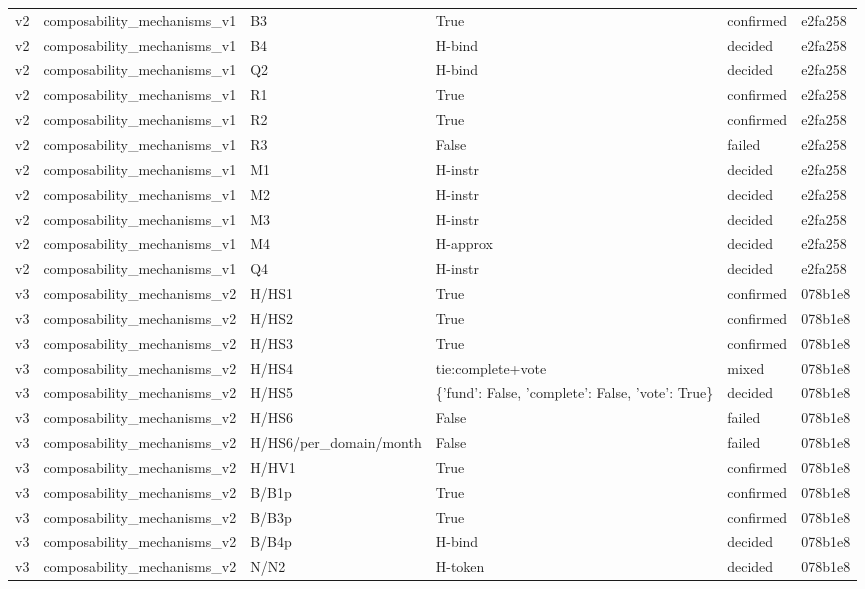 \begin{longtable}{llllll}
v2 & composability\_mechanisms\_v1 & B3 & True & confirmed & e2fa258 \\
v2 & composability\_mechanisms\_v1 & B4 & H-bind & decided & e2fa258 \\
v2 & composability\_mechanisms\_v1 & Q2 & H-bind & decided & e2fa258 \\
v2 & composability\_mechanisms\_v1 & R1 & True & confirmed & e2fa258 \\
v2 & composability\_mechanisms\_v1 & R2 & True & confirmed & e2fa258 \\
v2 & composability\_mechanisms\_v1 & R3 & False & failed & e2fa258 \\
v2 & composability\_mechanisms\_v1 & M1 & H-instr & decided & e2fa258 \\
v2 & composability\_mechanisms\_v1 & M2 & H-instr & decided & e2fa258 \\
v2 & composability\_mechanisms\_v1 & M3 & H-instr & decided & e2fa258 \\
v2 & composability\_mechanisms\_v1 & M4 & H-approx & decided & e2fa258 \\
v2 & composability\_mechanisms\_v1 & Q4 & H-instr & decided & e2fa258 \\
v3 & composability\_mechanisms\_v2 & H/HS1 & True & confirmed & 078b1e8 \\
v3 & composability\_mechanisms\_v2 & H/HS2 & True & confirmed & 078b1e8 \\
v3 & composability\_mechanisms\_v2 & H/HS3 & True & confirmed & 078b1e8 \\
v3 & composability\_mechanisms\_v2 & H/HS4 & tie:complete+vote & mixed & 078b1e8 \\
v3 & composability\_mechanisms\_v2 & H/HS5 & \{'fund': False, 'complete': False, 'vote': True\} & decided & 078b1e8 \\
v3 & composability\_mechanisms\_v2 & H/HS6 & False & failed & 078b1e8 \\
v3 & composability\_mechanisms\_v2 & H/HS6/per\_domain/month & False & failed & 078b1e8 \\
v3 & composability\_mechanisms\_v2 & H/HV1 & True & confirmed & 078b1e8 \\
v3 & composability\_mechanisms\_v2 & B/B1p & True & confirmed & 078b1e8 \\
v3 & composability\_mechanisms\_v2 & B/B3p & True & confirmed & 078b1e8 \\
v3 & composability\_mechanisms\_v2 & B/B4p & H-bind & decided & 078b1e8 \\
v3 & composability\_mechanisms\_v2 & N/N2 & H-token & decided & 078b1e8 \\

\end{longtable}
